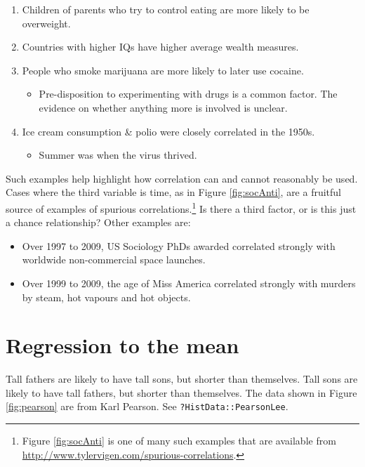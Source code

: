 \documentclass[
  10pt,
  b5paper]{book}
\providecommand{\tightlist}{%
  \setlength{\itemsep}{0pt}\setlength{\parskip}{0pt}}
\begin{document}
\begin{enumerate}
\def\labelenumi{\arabic{enumi}.}
\tightlist
\item
  Children of parents who try to control eating are more likely
  to be overweight.
\item
  Countries with higher IQs have higher average wealth measures.
\item
  People who smoke marijuana are more likely to later use cocaine.

  \begin{itemize}
  \tightlist
  \item
    Pre-disposition to experimenting with drugs is a common factor.
    The evidence on whether anything more is involved is unclear.
  \end{itemize}
\item
  Ice cream consumption \& polio were closely correlated in the 1950s.

  \begin{itemize}
  \tightlist
  \item
    Summer was when the virus thrived.
  \end{itemize}
\end{enumerate}

Such examples help highlight how correlation can and
cannot reasonably be used. Cases where the third variable is
time, as in Figure \ref{fig:socAnti}, are a fruitful source
of examples of spurious correlations.\footnote{Figure \ref{fig:socAnti}
  is one of many such examples that are available from\\
  \url{http://www.tylervigen.com/spurious-correlations}.}
Is there a third factor, or is this just a chance relationship?
Other examples are:

\begin{itemize}
\tightlist
\item
  Over 1997 to 2009, US Sociology PhDs awarded correlated strongly
  with worldwide non-commercial space launches.
\item
  Over 1999 to 2009, the age of Miss America correlated strongly
  with murders by steam, hot vapours and hot objects.
\end{itemize}

\hypertarget{regression-to-the-mean}{%
\section{Regression to the mean}\label{regression-to-the-mean}}

Tall fathers are likely to have tall sons, but shorter than themselves.
Tall sons are likely to have tall fathers, but shorter than themselves.
The data shown in Figure \ref{fig:pearson} are from Karl Pearson.
See \texttt{?HistData::PearsonLee}.
\end{document}
